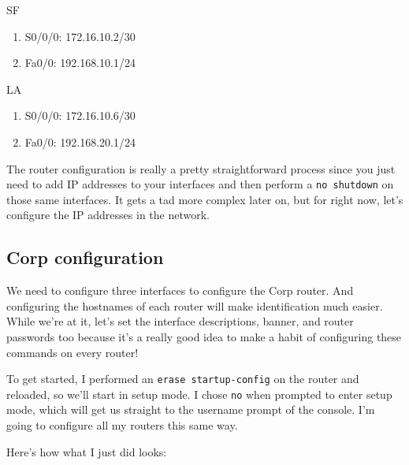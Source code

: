 SF

\begin{enumerate}
\item
  S0/0/0: 172.16.10.2/30
\item
  Fa0/0: 192.168.10.1/24
\end{enumerate}

LA

\begin{enumerate}
\item
  S0/0/0: 172.16.10.6/30
\item
  Fa0/0: 192.168.20.1/24
\end{enumerate}

The router configuration is really a pretty straightforward process
since you just need to add IP addresses to your interfaces and then
perform a \texttt{no\ shutdown} on those same interfaces. It gets a tad
more complex later on, but for right now, let's configure the IP
addresses in the network.

\subsection{Corp configuration}

We need to configure three interfaces to configure the Corp router. And
configuring the hostnames of each router will make identification much
easier. While we're at it, let's set the interface descriptions, banner,
and router passwords too because it's a really good idea to make a habit
of configuring these commands on every router!

To get started, I performed an \texttt{erase\ startup-config} on the
router and reloaded, so we'll start in setup mode. I chose \texttt{no}
when prompted to enter setup mode, which will get us straight to the
username prompt of the console. I'm going to configure all my routers
this same way.

Here's how what I just did looks:

